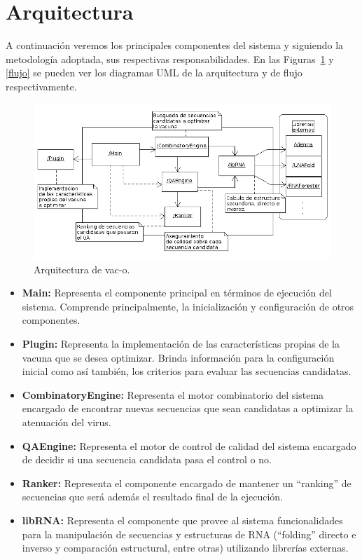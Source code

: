\section{Arquitectura}

A continuaci\'on veremos los principales componentes del sistema y siguiendo la
metodolog\'ia adoptada, sus respectivas responsabilidades. En las 
Figuras~\ref{arquitectura} y \ref{flujo} se pueden ver los diagramas UML
de la arquitectura y de flujo respectivamente.

\begin{figure} 
  \centering
  \includegraphics[scale=0.5]{architecture.png}
  \caption{Arquitectura de vac-o.}
\label{arquitectura}
\end{figure}

\begin{itemize}
   \item \textbf{Main:} Representa el componente principal en t\'erminos de
ejecuci\'on del sistema. Comprende principalmente, la inicializaci\'on y
configuraci\'on de otros componentes.
   \item \textbf{Plugin:} Representa la implementaci\'on de las
caracter\'isticas propias de la vacuna que se desea optimizar. Brinda
informaci\'on para la configuraci\'on inicial como as\'i tambi\'en, los
criterios para evaluar las secuencias candidatas.
   \item \textbf{CombinatoryEngine:} Representa el motor combinatorio del
sistema encargado de encontrar nuevas secuencias que sean candidatas a
optimizar la atenuaci\'on del virus.
   \item \textbf{QAEngine:} Representa el motor de control de calidad del
sistema encargado de decidir si una secuencia candidata pasa el control o no.
   \item \textbf{Ranker:} Representa el componente encargado de mantener un
``ranking'' de secuencias que ser\'a adem\'as el resultado final de la
ejecuci\'on.
   \item \textbf{libRNA:} Representa el componente que provee al sistema
funcionalidades para la manipulaci\'on de secuencias y estructuras de \ac{RNA}
(``folding'' directo e inverso y comparaci\'on estructural, entre otras)
utilizando librer\'ias externas.
  \end{itemize}


